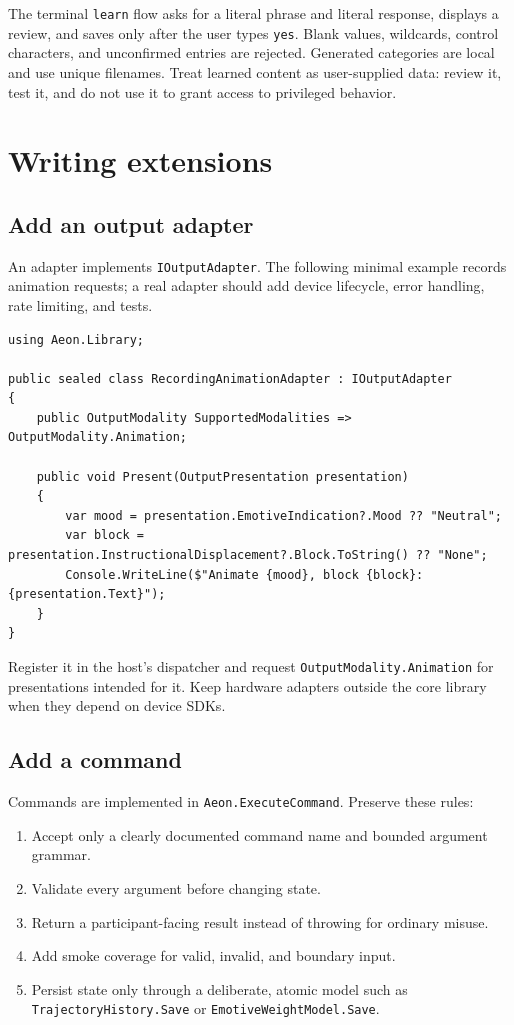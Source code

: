 \documentclass[11pt,a4paper]{article}
\begin{document}
The terminal \texttt{learn} flow asks for a literal phrase and literal response, displays a review, and saves only after the user types \texttt{yes}. Blank values, wildcards, control characters, and unconfirmed entries are rejected. Generated categories are local and use unique filenames. Treat learned content as user-supplied data: review it, test it, and do not use it to grant access to privileged behavior.

\section{Writing extensions}

\subsection{Add an output adapter}

An adapter implements \texttt{IOutputAdapter}. The following minimal example records animation requests; a real adapter should add device lifecycle, error handling, rate limiting, and tests.

\begin{minipage}{\linewidth}
\begin{lstlisting}[language={[Sharp]C}]
using Aeon.Library;

public sealed class RecordingAnimationAdapter : IOutputAdapter
{
    public OutputModality SupportedModalities => OutputModality.Animation;

    public void Present(OutputPresentation presentation)
    {
        var mood = presentation.EmotiveIndication?.Mood ?? "Neutral";
        var block = presentation.InstructionalDisplacement?.Block.ToString() ?? "None";
        Console.WriteLine($"Animate {mood}, block {block}: {presentation.Text}");
    }
}
\end{lstlisting}
\end{minipage}

Register it in the host's dispatcher and request \texttt{OutputModality.Animation} for presentations intended for it. Keep hardware adapters outside the core library when they depend on device SDKs.

\subsection{Add a command}

Commands are implemented in \texttt{Aeon.ExecuteCommand}. Preserve these rules:

\begin{enumerate}
  \item Accept only a clearly documented command name and bounded argument grammar.
  \item Validate every argument before changing state.
  \item Return a participant-facing result instead of throwing for ordinary misuse.
  \item Add smoke coverage for valid, invalid, and boundary input.
  \item Persist state only through a deliberate, atomic model such as \texttt{TrajectoryHistory.Save} or \texttt{EmotiveWeightModel.Save}.
\end{enumerate}
\end{document}
